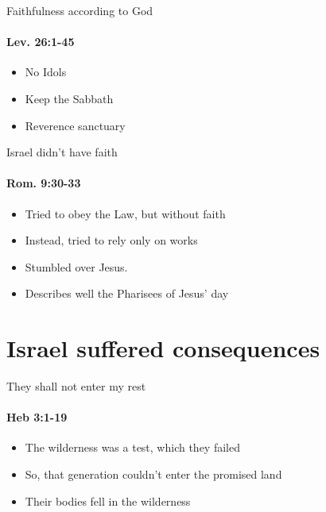 \begin{frame}{Faithfulness according to God}
\framesubtitle{Lev. 26:1-45}

	\begin{itemize}
		\item No Idols
		\item Keep the Sabbath
		\item Reverence sanctuary
	\end{itemize}

\end{frame}

\begin{frame}{Israel didn't have faith}
\framesubtitle{Rom. 9:30-33}

	\begin{itemize}
		\item Tried to obey the Law, but without faith
		\item Instead, tried to rely only on works
		\item Stumbled over Jesus.
		\item Describes well the Pharisees of Jesus' day
	\end{itemize}

\end{frame}

\section{Israel suffered consequences}

\begin{frame}{They shall not enter my rest}
\framesubtitle{Heb 3:1-19}
\begin{itemize}
	\item The wilderness was a test, which they failed
	\item So, that generation couldn't enter the promised land
	\item Their bodies fell in the wilderness
\end{itemize}

\end{frame}

